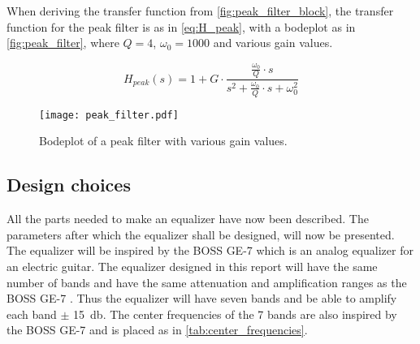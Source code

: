 When deriving the transfer function from \autoref{fig:peak_filter_block}, the transfer function for the peak filter is as in \autoref{eq:H_peak}, with a bodeplot as in \autoref{fig:peak_filter}, where $Q = 4$, $\omega_0 = 1000$ and various gain values. 

\begin{equation}\label{eq:H_peak}
        H_{peak}(s) = 1+G \cdot \frac{\frac{\omega_0}{Q}\cdot s}{s^2+\frac{\omega_0}{Q}\cdot s + \omega_0^2}
    \end{equation}
    
    \startexplain
    \stopexplain

\begin{figure}[!h]
    \centering
        \texttt{[image: peak\_filter.pdf]}
        \caption{Bodeplot of a peak filter with various gain values.}
        \label{fig:peak_filter}
  \end{figure} 
  
\subsection{Design choices}
All the parts needed to make an equalizer have now been described. The parameters after which the equalizer shall be designed, will now be presented. 
The equalizer will be inspired by the BOSS GE-7 which is an analog equalizer for an electric guitar. The equalizer designed in this report will have the same number of bands and have the same attenuation and amplification ranges as the BOSS GE-7 \citep{Boss_GE7}. Thus the equalizer will have seven bands and be able to amplify each band $\pm$ \SI{15}{\decibel}.
The center frequencies of the 7 bands are also inspired by the BOSS GE-7 and is placed as in \autoref{tab:center_frequencies}.

